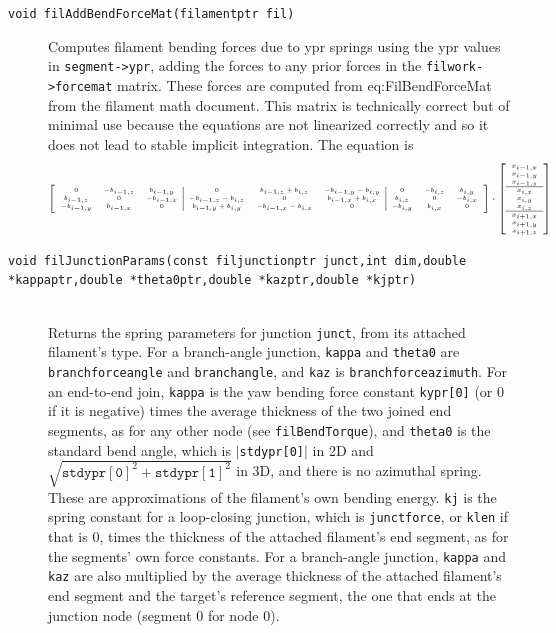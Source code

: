 \documentclass {scrbook}
\newcommand {\ttt} {\texttt}
\begin{document}
\begin{description}
\item[\ttt{void filAddBendForceMat(filamentptr fil)}]
Computes filament bending forces due to ypr springs using the ypr values in \ttt{segment->ypr}, adding the forces to any prior forces in the \ttt{filwork->forcemat} matrix. These forces are computed from eq:FilBendForceMat from the filament math document. This matrix is technically correct but of minimal use because the equations are not linearized correctly and so it does not lead to stable implicit integration. The equation is
\begin{equation*}
\tiny
\left[ \begin{array}{ccc|ccc|ccc}
0 & -b_{i-1,z} & b_{i-1,y} & 0 & b_{i-1,z}+b_{i,z} & -b_{i-1,y}-b_{i,y} & 0 & -b_{i,z} & b_{i,y} \\
b_{i-1,z} & 0 & -b_{i-1,x} & -b_{i-1,z}-b_{i,z} & 0 & b_{i-1,x}+b_{i,x} & b_{i,z} & 0 & -b_{i,x} \\
-b_{i-1,y} & b_{i-1,x} & 0 & b_{i-1,y}+b_{i,y} & -b_{i-1,x}-b_{i,x} & 0 & -b_{i,y} & b_{i,x} & 0 \\
\end{array} \right] \cdot
\left[ \begin{array}{c}
x_{i-1,x} \\ x_{i-1,y} \\ x_{i-1,z} \\ \hline x_{i,x} \\ x_{i,y} \\ x_{i,z} \\ \hline x_{i+1,x} \\ x_{i+1,y} \\ x_{i+1,z}
\end{array} \right]
\end{equation*}

\item[\ttt{void filJunctionParams(const filjunctionptr junct,int dim,double *kappaptr,double *theta0ptr,double *kazptr,double *kjptr)}] %
\hfill \\
Returns the spring parameters for junction \ttt{junct}, from its attached filament's type. For a branch-angle junction, \ttt{kappa} and \ttt{theta0} are \ttt{branchforceangle} and \ttt{branchangle}, and \ttt{kaz} is \ttt{branchforceazimuth}. For an end-to-end join, \ttt{kappa} is the yaw bending force constant \ttt{kypr[0]} (or 0 if it is negative) times the average thickness of the two joined end segments, as for any other node (see \ttt{filBendTorque}), and \ttt{theta0} is the standard bend angle, which is $|$\ttt{stdypr[0]}$|$ in 2D and $\sqrt{\mathtt{stdypr[0]}^2+\mathtt{stdypr[1]}^2}$ in 3D, and there is no azimuthal spring. These are approximations of the filament's own bending energy. \ttt{kj} is the spring constant for a loop-closing junction, which is \ttt{junctforce}, or \ttt{klen} if that is 0, times the thickness of the attached filament's end segment, as for the segments' own force constants. For a branch-angle junction, \ttt{kappa} and \ttt{kaz} are also multiplied by the average thickness of the attached filament's end segment and the target's reference segment, the one that ends at the junction node (segment 0 for node 0).


\end{description}
\end{document}
